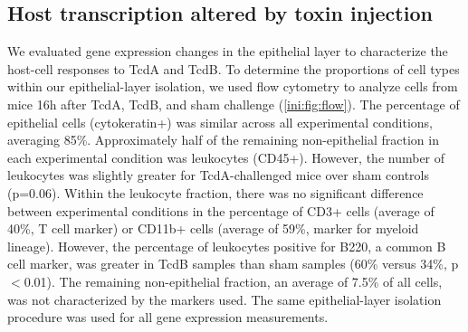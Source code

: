 \begin{table}
\centering
{}
\caption[Infiltration of immune cells 6h and 16h after cecal injection]
          {\textbf{Infiltration of immune cells 6h and 16h after cecal injection}
          To determine if monocytes/macrophages, dendritic cells, and eosinophils
infiltrate the epithelial layer after cecal injection of toxin, we used
immunohistochemistry markers (Methods). Cecal tissue sections were scored 
by analyzing each section for the number of positive cells and overall
staining intensity.  Samples were assigned scores of + (few cells/weak staining), 
++ (moderate staining), or +++ (increased cell/intense staining).
          }
\label{ini:tab:ihc}
\end{table}


\subsection{ Host transcription altered by toxin injection }
We evaluated gene expression changes in the epithelial layer to 
characterize the host-cell responses to TcdA and TcdB. To determine 
the proportions of cell types within our epithelial-layer isolation, 
we used flow cytometry to analyze cells from mice 16h after TcdA, TcdB, 
and sham challenge (\autoref{ini:fig:flow}). The percentage of epithelial 
cells (cytokeratin+) was similar across all experimental conditions, 
averaging 85\%. Approximately half of the remaining non-epithelial 
fraction in each experimental condition was leukocytes (CD45+). However, 
the number of leukocytes was slightly greater for TcdA-challenged mice 
over sham controls (p=0.06). Within the leukocyte fraction, there was 
no significant difference between experimental conditions in the 
percentage of CD3+ cells (average of 40\%, T cell marker) or CD11b+ 
cells (average of 59\%, marker for myeloid lineage). However, the 
percentage of leukocytes positive for B220, a common B cell marker, 
was greater in TcdB samples than sham samples (60\% versus 34\%, 
p$<$0.01). The remaining non-epithelial fraction, an average of 7.5\% 
of all cells, was not characterized by the markers used. The same 
epithelial-layer isolation procedure was used for all gene expression 
measurements.

